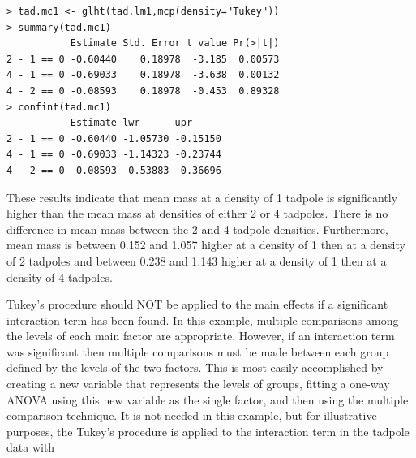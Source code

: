 \documentclass[10pt,openany]{book}\usepackage[]{graphicx}\usepackage[]{color}
\makeatletter
\newenvironment{kframe}{%
 \def\at@end@of@kframe{}%
 \ifinner\ifhmode%
  \def\at@end@of@kframe{\end{minipage}}%
  \begin{minipage}{\columnwidth}%
 \fi\fi%
 \def\FrameCommand##1{\hskip\@totalleftmargin \hskip-\fboxsep
 \colorbox{shadecolor}{##1}\hskip-\fboxsep
     \hskip-\linewidth \hskip-\@totalleftmargin \hskip\columnwidth}%
 \MakeFramed {\advance\hsize-\width
   \@totalleftmargin\z@ \linewidth\hsize
   \@setminipage}}%
 {\par\unskip\endMakeFramed%
 \at@end@of@kframe}
\newenvironment{knitrout}{}{} %
\makeatother
\begin{document}
\begin{knitrout}
\color{fgcolor}\begin{kframe}
\begin{verbatim}
> tad.mc1 <- glht(tad.lm1,mcp(density="Tukey"))
> summary(tad.mc1)
           Estimate Std. Error t value Pr(>|t|)
2 - 1 == 0 -0.60440    0.18978  -3.185  0.00573
4 - 1 == 0 -0.69033    0.18978  -3.638  0.00132
4 - 2 == 0 -0.08593    0.18978  -0.453  0.89328
> confint(tad.mc1)
           Estimate lwr      upr     
2 - 1 == 0 -0.60440 -1.05730 -0.15150
4 - 1 == 0 -0.69033 -1.14323 -0.23744
4 - 2 == 0 -0.08593 -0.53883  0.36696
\end{verbatim}
\end{kframe}
\end{knitrout}

These results indicate that mean mass at a density of 1 tadpole is significantly higher than the mean mass at densities of either 2 or 4 tadpoles.  There is no difference in mean mass between the 2 and 4 tadpole densities.  Furthermore, mean mass is between 0.152 and 1.057 higher at a density of 1 then at a density of 2 tadpoles and between 0.238 and 1.143 higher at a density of 1 then at a density of 4 tadpoles.

Tukey's procedure should NOT be applied to the main effects if a significant interaction term has been found.  In this example, multiple comparisons among the levels of each main factor are appropriate.  However, if an interaction term was significant then multiple comparisons must be made between each group defined by the levels of the two factors.  This is most easily accomplished by creating a new variable that represents the levels of groups, fitting a one-way ANOVA using this new variable as the single factor, and then using the multiple comparison technique.  It is not needed in this example, but for illustrative purposes, the Tukey's procedure is applied to the interaction term in the tadpole data with
\end{document}
